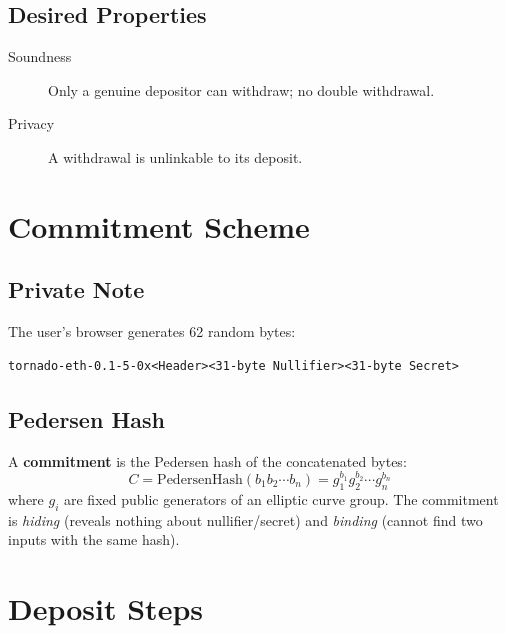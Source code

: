 \documentclass[12pt,a4paper,openany]{book}
\theoremstyle{definition}
\theoremstyle{plain}
\theoremstyle{remark}
\begin{document}
\subsection{Desired Properties}

\begin{description}
  \item[Soundness] Only a genuine depositor can withdraw; no double withdrawal.
  \item[Privacy]   A withdrawal is unlinkable to its deposit.
\end{description}

\section{Commitment Scheme}

\subsection{Private Note}

The user's browser generates 62 random bytes:
\begin{lstlisting}[language={}]
tornado-eth-0.1-5-0x<Header><31-byte Nullifier><31-byte Secret>
\end{lstlisting}

\subsection{Pedersen Hash}

A \textbf{commitment} is the Pedersen hash of the concatenated bytes:
\begin{equation}
  C = \mathrm{PedersenHash}(b_1 b_2\cdots b_n)
    = g_1^{b_1} g_2^{b_2}\cdots g_n^{b_n}
\end{equation}
where $g_i$ are fixed public generators of an elliptic curve group.
The commitment is \emph{hiding} (reveals nothing about nullifier/secret)
and \emph{binding} (cannot find two inputs with the same hash).

\section{Deposit Steps}
\end{document}
